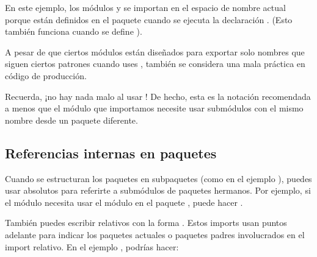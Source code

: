 \documentclass[a5paper,10pt,spanish]{sphinxmanual}
\begin{document}
\sphinxAtStartPar
En este ejemplo, los módulos  y  se importan en el espacio de nombre actual porque están definidos en el paquete  cuando se ejecuta la declaración .  (Esto también funciona cuando se define ).

\sphinxAtStartPar
A pesar de que ciertos módulos están diseñados para exportar solo nombres que siguen ciertos patrones cuando uses , también se considera una mala práctica en código de producción.

\sphinxAtStartPar
Recuerda, ¡no hay nada malo al usar ! De hecho, esta es la notación recomendada a menos que el módulo que importamos necesite usar submódulos con el mismo nombre desde un paquete diferente.


\subsection{Referencias internas en paquetes}
\label{\detokenize{tutorial/modules:intra-package-references}}\label{\detokenize{tutorial/modules:id2}}
\sphinxAtStartPar
Cuando se estructuran los paquetes en sub\sphinxhyphen{}paquetes (como en el ejemplo ), puedes usar  absolutos para referirte a submódulos de paquetes hermanos.  Por ejemplo, si el módulo  necesita usar el módulo  en el paquete , puede hacer .

\sphinxAtStartPar
También puedes escribir  relativos con la forma .  Estos imports usan puntos adelante para indicar los paquetes actuales o paquetes padres involucrados en el import relativo. En el ejemplo , podrías hacer:

\begin{sphinxVerbatim}[commandchars=\\\{\}]
   
   
   
\end{sphinxVerbatim}
\end{document}

